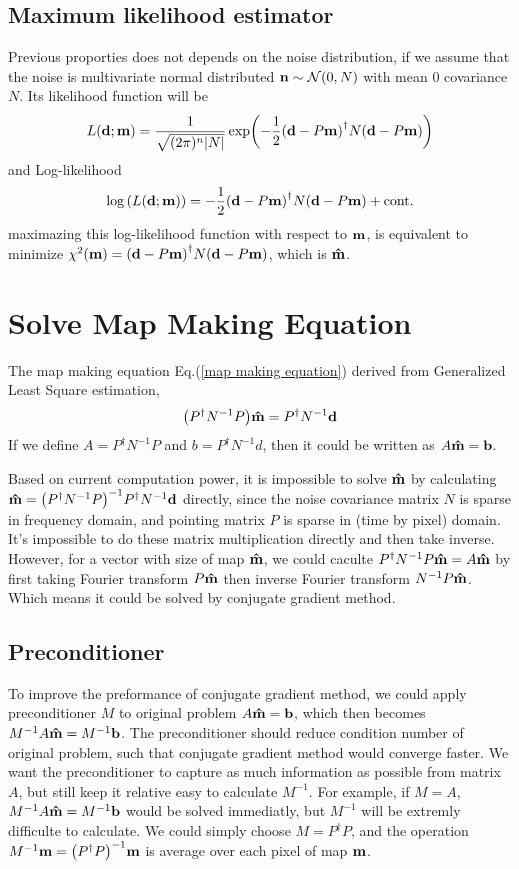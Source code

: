 \documentclass[11pt, letterpaper]{article}
\newcommand{\vbd}{\vb{d}}
\newcommand{\vbm}{\vb{m}}
\newcommand{\vbn}{\vb{n}}
\newcommand{\vbb}{\vb{b}}
\newcommand{\inv}[1]{#1^{-1}}
\newcommand{\hatm}{\vb{\hat{m}}}
\newcommand{\Pdagger}{P^{\dagger}}
\newcommand{\PPinv}[1]{\inv{\qty(\Pdagger #1 P)}}
\begin{document}
\subsection{Maximum likelihood estimator}
Previous proporties does not depends on the noise distribution, 
if we assume that the noise is multivariate normal distributed
$\vbn \sim \mathcal{N}(0, N)$ with mean $0$ covariance $N$.
Its likelihood function will be
\begin{align}
L\qty(\vbd;\vbm) = \frac{1}{\sqrt{(2\pi)^n \abs{N}}} 
    \exp(-\frac{1}{2} \qty(\vbd - P\vbm)^{\dagger} N \qty(\vbd - P\vbm))
\end{align}
and Log-likelihood
\begin{align}
\log\qty(L\qty(\vbd;\vbm))
= -\frac{1}{2} \qty(\vbd - P\vbm)^{\dagger} N \qty(\vbd - P\vbm) + \text{cont.}  
\end{align}
maximazing this log-likelihood function with respect to $\vbm$, is equivalent
to minimize $\chi^2(\vbm) =\qty(\vbd - P\vbm)^{\dagger} N \qty(\vbd - P\vbm)$,
which is $\hatm$.

\section{Solve Map Making Equation}

The map making equation Eq.(\ref{map making equation}) derived from Generalized
Least Square estimation,
\begin{align}
\qty(\Pdagger \inv{N}  P) \hatm = \Pdagger \inv{N} \vbd \label{map making eq}
\end{align}
If we define $A = \Pdagger \inv{N} P$ and $b = \Pdagger \inv{N} d$,
then it could be written as $A\hatm = \vbb$.

Based on current computation power, it is impossible to solve $\hatm$
by calculating $\hatm = \PPinv{\inv{N}} \Pdagger \inv{N} \vbd$ directly,
since the noise covariance matrix $N$ is sparse in frequency domain,
and pointing matrix $P$ is sparse in (time by pixel) domain.
It's impossible to do these matrix multiplication directly and then take
inverse.
However, for a vector with size of map $\hatm$, we could caculte
$\Pdagger \inv{N} P \hatm = A\hatm$ by first taking Fourier transform $P\hatm$
then inverse Fourier transform $\inv{N}P\hatm$.
Which means it could be solved by conjugate gradient method.


\subsection{Preconditioner}
To improve the preformance of conjugate gradient method,
we could apply preconditioner $M$ to original problem $A\hatm = \vbb$,
which then becomes $\inv{M}A\hatm = \inv{M} \vbb$.
The preconditioner should reduce condition number of original problem,
such that conjugate gradient method would converge faster.
We want the preconditioner to capture as much information as possible from 
matrix $A$, but still keep it relative easy to calculate $\inv{M}$.
For example, if $M = A$, $\inv{M} A \hatm = \inv{M} \vbb$ would be solved
immediatly, but $\inv{M}$ will be extremly difficulte to calculate.
We could simply choose $M = \Pdagger P$,
and the operation $\inv{M} \vbm = \PPinv{} \vbm$ is average over each pixel 
of map $\vbm$.
\end{document}
